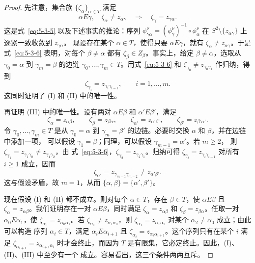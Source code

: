 \begin{proof}
先注意，集合族 $\{\zeta_\alpha\}_{\alpha\in T}$ 满足
\begin{equation}\label{eq:5-3-6}
  \alpha E\gamma,\quad \zeta_\alpha\ne z_{\alpha\gamma}
  \quad\Longrightarrow\quad
  \zeta_\gamma=z_{\gamma\alpha}.
\end{equation}
这是式~\eqref{eq:5-3-5} 以及下述事实的推论：序列
$\phi_{\gamma\alpha}^\nu=(\phi_\gamma^\nu)^{-1}\circ\phi_\alpha^\nu$
在 $S^2\setminus\{z_{\alpha\gamma}\}$ 上逐紧一致收敛到 $z_{\gamma\alpha}$。
现设存在某个 $\alpha\in T$，使得只要 $\alpha E\gamma$，就有
$\zeta_\alpha\ne z_{\alpha\gamma}$。于是式~\eqref{eq:5-3-6} 表明，对每个
$\beta\ne\alpha$ 都有 $\zeta_\beta\in Z_\beta$。事实上，给定
$\beta\ne\alpha$，选取从 $\gamma_0=\alpha$ 到 $\gamma_m=\beta$ 的边链
$\gamma_0,\ldots,\gamma_m\in T$。用式~\eqref{eq:5-3-6} 和
$\zeta_{\gamma_0}\ne z_{\gamma_0\gamma_1}$ 作归纳，得到
\[
  \zeta_{\gamma_i}=z_{\gamma_i\gamma_{i-1}},
  \qquad i=1,\ldots,m.
\]
这同时证明了 (I) 和 (II) 中的唯一性。

再证明 (III) 中的唯一性。设有两对 $\alpha E\beta$ 和
$\alpha' E\beta'$，满足
\[
  \zeta_\alpha=z_{\alpha\beta},\qquad
  \zeta_\beta=z_{\beta\alpha},\qquad
  \zeta_{\alpha'}=z_{\alpha'\beta'},\qquad
  \zeta_{\beta'}=z_{\beta'\alpha'}.
\]
令 $\gamma_0,\ldots,\gamma_m\in T$ 是从 $\gamma_0=\alpha$ 到
$\gamma_m=\beta'$ 的边链。必要时交换 $\alpha$ 和 $\beta$，并在边链中添加一项，
可以假设 $\gamma_1=\beta$；同理，可以假设 $\gamma_{m-1}=\alpha'$。若 $m\ge2$，
则 $\zeta_{\gamma_1}=z_{\gamma_1\gamma_0}\ne z_{\gamma_1\gamma_2}$，由
式~\eqref{eq:5-3-6}，$\zeta_{\gamma_2}=z_{\gamma_2\gamma_1}$。归纳可得
$\zeta_{\gamma_i}=z_{\gamma_i\gamma_{i-1}}$ 对所有 $i\ge1$ 成立，因而
\[
  \zeta_{\alpha'}=z_{\gamma_{m-1}\gamma_{m-2}}
  \ne z_{\alpha'\beta'}.
\]
这与假设矛盾，故 $m=1$，从而
$\{\alpha,\beta\}=\{\alpha',\beta'\}$。

现在假设 (I) 和 (II) 都不成立。则对每个 $\alpha\in T$，存在
$\beta\in T$，使 $\alpha E\beta$ 且 $\zeta_\alpha=z_{\alpha\beta}$。我们证明存在一对
$\alpha E\beta$，同时满足
$\zeta_\alpha=z_{\alpha\beta}$ 和 $\zeta_\beta=z_{\beta\alpha}$。任取一对
$\alpha_0E\alpha_1$，使 $\zeta_{\alpha_0}=z_{\alpha_0\alpha_1}$。若
$\zeta_{\alpha_1}\ne z_{\alpha_1\alpha_0}$，则
$\zeta_{\alpha_1}=z_{\alpha_1\alpha_2}$ 对某个 $\alpha_2\ne\alpha_0$ 成立；由此可以构造
序列 $\alpha_i\in T$，满足 $\alpha_iE\alpha_{i+1}$ 且
$\zeta_{\alpha_i}=z_{\alpha_i\alpha_{i+1}}$。这个序列只有在某个 $i$ 满足
$\zeta_{\alpha_{i+1}}=z_{\alpha_{i+1}\alpha_i}$
时才会终止，而因为 $T$ 是有限集，它必定终止。因此，(I)、(II)、(III) 中至少有一个
成立。容易看出，这三个条件两两互斥。
\end{proof}

